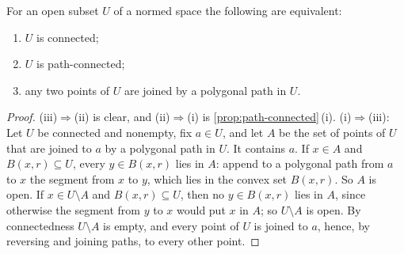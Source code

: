 \begin{figure}
\end{figure}

\begin{theorem}
\label{thm:connected-open}
For an open subset $U$ of a normed space the following are equivalent:
\begin{enumerate}
\item $U$ is connected;
\item $U$ is path-connected;
\item any two points of $U$ are joined by a polygonal path in $U$.
\end{enumerate}
\end{theorem}

\begin{proof}
(iii)$\Rightarrow$(ii) is clear, and (ii)$\Rightarrow$(i) is \cref{prop:path-connected}\,(i). (i)$\Rightarrow$(iii): Let $U$ be connected and nonempty, fix $a\in U$, and let $A$ be the set of points of $U$ that are joined to $a$ by a polygonal path in $U$. It contains $a$. If $x\in A$ and $B(x,r)\subseteq U$, every $y\in B(x,r)$ lies in $A$: append to a polygonal path from $a$ to $x$ the segment from $x$ to $y$, which lies in the convex set $B(x,r)$. So $A$ is open. If $x\in U\setminus A$ and $B(x,r)\subseteq U$, then no $y\in B(x,r)$ lies in $A$, since otherwise the segment from $y$ to $x$ would put $x$ in $A$; so $U\setminus A$ is open. By connectedness $U\setminus A$ is empty, and every point of $U$ is joined to $a$, hence, by reversing and joining paths, to every other point.
\end{proof}

